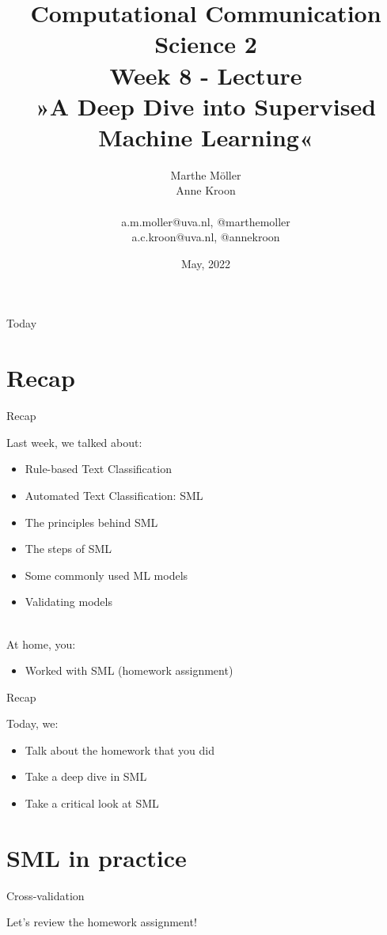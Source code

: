 \documentclass[handout]{beamer}
\title[Computational Communication Science 2]{\textbf{Computational Communication Science 2} \\Week 8 - Lecture\\ »A Deep Dive into Supervised Machine Learning«}
\author[Marthe Möller, Anne Kroon]{Marthe Möller \\ Anne Kroon \\ ~ \\ \footnotesize{a.m.moller@uva.nl, @marthemoller \\a.c.kroon@uva.nl, @annekroon} \\}
\date{May, 2022}
\institute[Digital Society Minor, University of Amsterdam]{Digital Society Minor, University of Amsterdam}
\begin{document}
	
	\begin{frame}{}
		\titlepage
\end{frame}
	
\begin{frame}{Today}
		\tableofcontents
\end{frame}


\section{Recap}

\begin{frame}{Recap}
	
Last week, we talked about:
	\begin{itemize}
		\item Rule-based Text Classification
		\item Automated Text Classification: SML
		\item The principles behind SML
		\item The steps of SML
		\item Some commonly used ML models
		\item Validating models \\\
	\end{itemize}
	
At home, you:
	\begin{itemize}
		\item Worked with SML (homework assignment)
	\end{itemize}
	
\end{frame}


\begin{frame}{Recap}
	
Today, we:
	\begin{itemize}
		\item Talk about the homework that you did
		\item Take a deep dive in SML
		\item Take a critical look at SML 
	\end{itemize}
	
\end{frame}


\section{SML in practice}


\begin{frame}{Cross-validation}
	
Let's review the homework assignment!
	
\end{frame}
\end{document}
